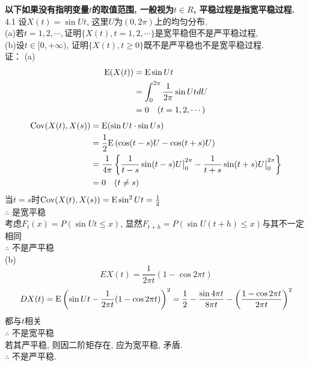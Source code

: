 

\textbf{以下如果没有指明变量$t$的取值范围, 一般视为$t \in R$, 平稳过程是指宽平稳过程.}\\
4.1 设$X(t) = \sin Ut$, 这里$U$为$(0, 2\pi)$上的均匀分布.\\
(a)若$t = 1, 2, \cdots , $证明$\{X(t), t = 1, 2, \cdots\}$是宽平稳但不是严平稳过程,\\
(b)设$t \in [0, +\infty)$, 证明$\{X(t) , t \geqslant 0\}$既不是严平稳也不是宽平稳过程.\\
证：
(a)
	\[
	\begin{split}
	\mathrm{E}(X(t)) & = \mathrm{E} \sin Ut\\
			& = \int^{2\pi}_0 \frac{1}{2\pi}\sin Ut dU\\
			& = 0 ~~~(t = 1,2,\cdots)
	\end{split}
	\]
	\[
	\begin{split}
	\mathrm{Cov}(X(t), X(s)) & = \mathrm{E}(\sin Ut \cdot \sin Us)\\
					& = \frac{1}{2}\mathrm{E}\left(\cos(t-s)U-\cos(t+s)U\right)\\
					& = \frac{1}{4\pi}\left\{\frac{1}{t-s}\sin(t-s)U\big |^{2\pi}_0 - \frac{1}{t+s}\sin(t+s)U\big |^{2\pi}_0\right\}\\
					& = 0 ~~~(t\neq s)
	\end{split}
	\]
	当$t=s$时$\mathrm{Cov}(X(t), X(s)) = \mathrm{E}\sin^2 Ut = \frac{1}{2}$\\
	$\therefore$ 是宽平稳\\
	考虑$F_t(x) = P(\sin Ut \leqslant x)$, 显然$F_{t+h} = P\left(\sin U(t+h) \leqslant x\right)$与其不一定相同\\
	$\therefore$ 不是严平稳\\
	(b)\[
	EX(t) = \frac{1}{2\pi t}(1-\cos2\pi t)
	\]
	\[
	DX(t) = \mathrm{E}\left(\sin Ut - \frac{1}{2\pi t}(1-\cos2\pi t)\right)^2 = \frac{1}{2} - \frac{\sin4\pi t}{8\pi t} - \left(\frac{1-\cos2\pi t}{2\pi t}\right)^2
	\]
	都与$t$相关\\
	$\therefore$ 不是宽平稳\\
	若其严平稳, 则因二阶矩存在, 应为宽平稳, 矛盾.\\
	$\therefore$ 不是严平稳.\\


